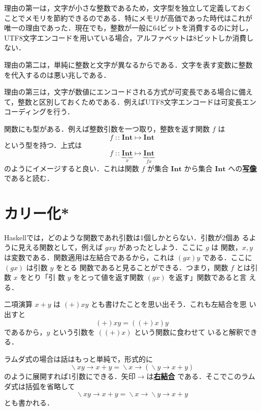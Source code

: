 \documentclass[a5paper,twoside,fleqn]{jsbook}
\newcommand{\programminglanguage}[1]{\textsf{#1}}
\newcommand{\haskell}{\programminglanguage{Haskell}}
\newcommand{\keyword}[1]{{\underline{\textbf{#1}}}}
\DeclareMathOperator{\mIn}{{:\!:}}
\DeclareMathOperator{\mLambda}{\backslash}
\DeclareMathOperator{\mLambdaArrow}{\rightarrow}
\DeclareMathOperator{\mMapsTo}{\mapsto}
\newcommand{\mType}[1]{\mathbf{#1}}
\newcommand{\mIntType}{\mType{Int}}
\newcommand{\mLambdaExp}[2]{\mLambda{#1}\mLambdaArrow{#2}}
\newcommand{\mProj}[2]{#1\mMapsTo#2}
\begin{document}
理由の第一は，文字が小さな整数であるため，文字型を独立して定義しておく
ことでメモリを節約できるのである．特にメモリが高価であった時代はこれが
唯一の理由であった．現在でも，整数が一般に64ビットを消費するのに対し，
UTF8文字エンコードを用いている場合，アルファベットは8ビットしか消費し
ない．

理由の第二は，単純に整数と文字が異なるからである．文字を表す変数に整数
を代入するのは悪い兆しである．

理由の第三は，文字が数値にエンコードされる方式が可変長である場合に備え
て，整数と区別しておくためである．例えばUTF8文字エンコードは可変長エン
コーディングを行う．

関数にも型がある．例えば整数引数を一つ取り，整数を返す関数 $f$ は
\begin{equation}
f\mIn\mProj{\mIntType}{\mIntType}
\end{equation}
という型を持つ．上式は
\begin{equation}
f \mIn\underbrace{\mIntType}_{x} \mMapsTo \underbrace{\mIntType}_{fx}
\end{equation}
のようにイメージすると良い．これは関数 $f$ が集合 $\mIntType$ から集合
$\mIntType$ への\keyword{写像}であると読む．

\section{カリー化*}

\haskell では，どのような関数であれ引数は1個しかとらない．引数が2個あ
るように見える関数として，例えば $gxy$ があったとしよう．ここに $g$ は
関数，$x,y$ は変数である．関数適用は左結合であるから，これは
$\left(gx\right)y$ である．ここに $\left(gx\right)$ は引数 $y$ をとる
関数であると見ることができる．つまり，関数 $f$ とは引数 $x$ をとり「引
  数 $y$ をとって値を返す関数 $\left(gx\right)$ を返す」関数であると言
える．

二項演算 $x+y$ は $(+)xy$ とも書けたことを思い出そう．これも左結合を思
い出すと
\begin{equation}
(+)xy=\left((+)x\right)y
\end{equation}
であるから，$y$ という引数を $\left((+)x\right)$ という関数に食わせて
いると解釈できる．

ラムダ式の場合は話はもっと単純で，形式的に
\begin{equation}
\mLambdaExp{xy}{x+y} =\mLambdaExp{x}{\left(\mLambdaExp{y}{x+y}\right)}
\end{equation}
のように展開すれば1引数にできる．矢印$\mLambdaArrow$は\keyword{右結合}
である．そこでこのラムダ式は括弧を省略して
\begin{equation}
\mLambdaExp{xy}{x+y} =\mLambdaExp{x}{\mLambdaExp{y}{x+y}}
\end{equation}
とも書かれる．
\end{document}
